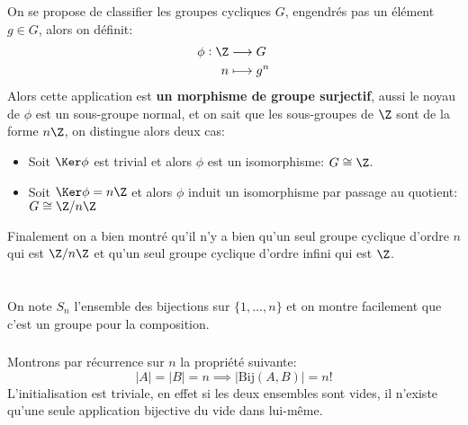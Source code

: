 \documentclass{report}
\begin{document}
      \subsection*{}
         On se propose de classifier les groupes cycliques \(G\), engendrés pas un élément \(g \in G\), alors on définit:
         \[
            \begin{aligned}
               \phi : \Z &\longrightarrow G\\
               n &\longmapsto g^n
            \end{aligned}
         \]
         Alors cette application est \textbf{un morphisme de groupe surjectif}, aussi le noyau de \(\phi\) est un sous-groupe normal, et on sait que les sous-groupes de \(\Z\) sont de la forme \(n\Z\), on distingue alors deux cas:
         \begin{itemize}
            \item Soit \(\Ker\phi\) est trivial et alors \(\phi\) est un isomorphisme: \(G \cong \Z\).
            \item Soit \(\Ker\phi = n\Z\) et alors \(\phi\) induit un isomorphisme par passage au quotient: \(G \cong \Z/n\Z\)
         \end{itemize} 
         Finalement on a bien montré qu'il n'y a bien qu'un seul groupe cyclique d'ordre \(n\) qui est \(\Z/n\Z\) et qu'un seul groupe cyclique d'ordre infini qui est \(\Z\).

   \chapter*{}
      On note $S_n$ l'ensemble des bijections sur $\{1, \ldots, n\}$ et on montre facilement que c'est un groupe pour la composition.
      \subsection*{}
         Montrons par récurrence sur $n$ la propriété suivante:
         $$
            |A| = |B| = n \implies \left|\text{Bij}(A, B)\right| = n!
         $$
         L'initialisation est triviale, en effet si les deux ensembles sont vides, il n'existe qu'une seule application bijective du vide dans lui-même.\\
      
\end{document}
